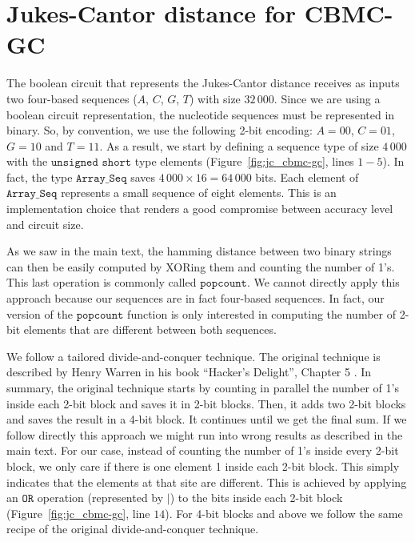 
\appendix

\chapter{Jukes-Cantor distance for CBMC-GC}\label{appendix:appendixA}

%

The boolean circuit that represents the Jukes-Cantor distance receives as inputs two four-based sequences ($A$, $C$, $G$, $T$) with size $32\, 000$. Since we are using a boolean circuit representation, the nucleotide sequences must be represented in binary. So, by convention, we use the following 2-bit encoding: $A = 00$, $C = 01$, $G = 10$ and $T = 11$. As a result, we start by defining a sequence type of size $4\, 000$ with the $\texttt{unsigned short}$ type elements (Figure~\ref{fig:jc_cbmc-gc}, lines $1-5$). In fact, the type $\texttt{Array\_Seq}$ saves $4\, 000 \times 16 = 64\, 000$ bits. Each element of $\texttt{Array\_Seq}$ represents a small sequence of eight elements. This is an implementation choice that renders a good compromise between accuracy level and circuit size.

As we saw in the main text, the hamming distance between two binary strings can then be easily computed by XORing them and counting the number of 1’s. This last operation is commonly called $\texttt{popcount}$. We cannot directly apply this approach because our sequences are in fact four-based sequences. In fact, our version of the $\texttt{popcount}$ function is only interested in computing the number of 2-bit elements that are different between both sequences.

We follow a tailored divide-and-conquer technique. The original technique is described by Henry Warren in his book “Hacker’s Delight”, Chapter 5 \citep{W12}. In summary, the original technique starts by counting in parallel the number of 1’s inside each 2-bit block and saves it in 2-bit blocks. Then, it adds two 2-bit blocks and saves the result in a 4-bit block. It continues until we get the final sum. If we follow directly this approach we might run into wrong results as described in the main text. For our case, instead of counting the number of 1’s inside every 2-bit block, we only care if there is one element 1 inside each 2-bit block. This simply indicates that the elements at that site are different. This is achieved by applying an $\texttt{OR}$ operation (represented by $\texttt{|}$) to the bits inside each 2-bit block (Figure~\ref{fig:jc_cbmc-gc}, line $14$). For 4-bit blocks and above we follow the same recipe of the original divide-and-conquer technique. 

